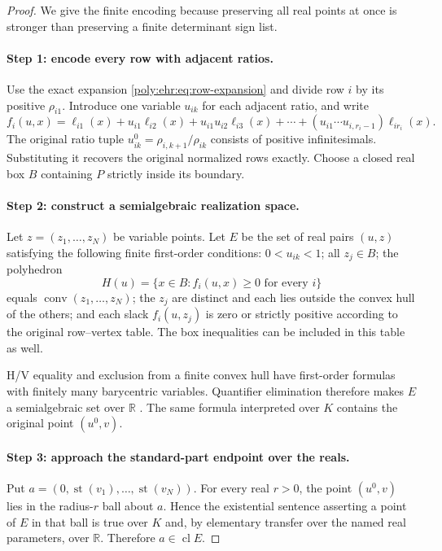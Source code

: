 \documentclass[11pt,a4paper]{article}
\numberwithin{equation}{section}
\theoremstyle{plain}
\newcommand{\R}{\mathbb R}
\newcommand{\st}{\operatorname{st}}
\newcommand{\conv}{\operatorname{conv}}
\newcommand{\cl}{\operatorname{cl}}
\begin{document}
\begin{proof}
We give the finite encoding because preserving all real points at once is
stronger than preserving a finite determinant sign list.

\paragraph{Step 1: encode every row with adjacent ratios.}
Use the exact expansion \eqref{poly:ehr:eq:row-expansion} and divide row $i$ by its
positive $\rho_{i1}$. Introduce one variable $u_{ik}$ for each adjacent
ratio, and write
\begin{equation}\label{poly:ehr:eq:row-u}
 f_i(u,x)=\ell_{i1}(x)+u_{i1}\ell_{i2}(x)
 +u_{i1}u_{i2}\ell_{i3}(x)+\cdots
 +(u_{i1}\cdots u_{i,r_i-1})\ell_{ir_i}(x).
\end{equation}
The original ratio tuple $u^0_{ik}=\rho_{i,k+1}/\rho_{ik}$ consists of
positive infinitesimals. Substituting it recovers the original normalized
rows exactly. Choose a closed real box $B$ containing $P$ strictly inside
its boundary.

\paragraph{Step 2: construct a semialgebraic realization space.}
Let $z=(z_1,\ldots,z_N)$ be variable points. Let $E$ be the set of real
pairs $(u,z)$ satisfying the following finite first-order conditions:
$0<u_{ik}<1$; all $z_j\in B$; the polyhedron
\[
 H(u)=\{x\in B:f_i(u,x)\geq0\text{ for every }i\}
\]
equals $\conv(z_1,\ldots,z_N)$; the $z_j$ are distinct and each lies outside
the convex hull of the others; and each slack $f_i(u,z_j)$ is zero or
strictly positive according to the original row--vertex table. The box
inequalities can be included in this table as well.

H/V equality and exclusion from a finite convex hull have first-order
formulas with finitely many barycentric variables. Quantifier elimination
therefore makes $E$ a semialgebraic set over $\R$ \cite{ehr:bpr}. The same
formula interpreted over $K$ contains the original point $(u^0,v)$.

\paragraph{Step 3: approach the standard-part endpoint over the reals.}
Put $a=(0,\st(v_1),\ldots,\st(v_N))$. For every real $r>0$, the point
$(u^0,v)$ lies in the radius-$r$ ball about $a$. Hence the existential
sentence asserting a point of $E$ in that ball is true over $K$ and,
by elementary transfer over the named real parameters, over $\R$.
Therefore $a\in\cl E$.


\end{proof}
\end{document}
